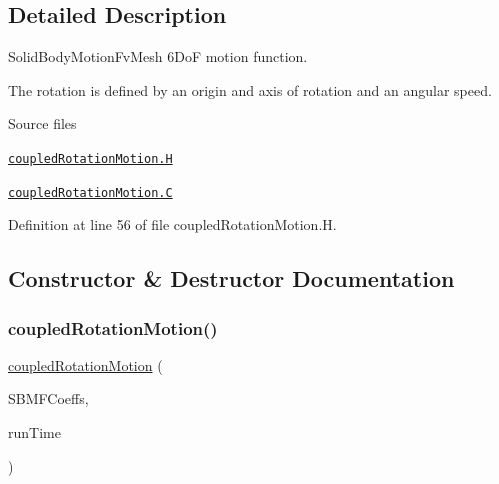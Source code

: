 \subsection{Detailed Description}
Solid\+Body\+Motion\+Fv\+Mesh 6\+DoF motion function. 

\label{_Description}%
 The rotation is defined by an origin and axis of rotation and an angular speed.

\begin{DoxyParagraph}{Source files}

\begin{DoxyItemize}
\item \href{../../../home/carlo/data/GeN-Foam/GeN-Foam_ffn/GeN-Foam/GeN-Foam/FMU4FOAM/ECI4FOAM/src/externalComm/externalIO/input/meshMotion/coupledRotationMotion/coupledRotationMotion.H}{\tt coupled\+Rotation\+Motion.\+H} 
\item \href{../../../home/carlo/data/GeN-Foam/GeN-Foam_ffn/GeN-Foam/GeN-Foam/FMU4FOAM/ECI4FOAM/src/externalComm/externalIO/input/meshMotion/coupledRotationMotion/coupledRotationMotion.C}{\tt coupled\+Rotation\+Motion.\+C} 
\end{DoxyItemize}
\end{DoxyParagraph}


Definition at line 56 of file coupled\+Rotation\+Motion.\+H.



\subsection{Constructor \& Destructor Documentation}
\mbox{\label{classFoam_1_1solidBodyMotionFunctions_1_1coupledRotationMotion_a7ad16617661870692e4069c402e74751}} 
\subsubsection{\texorpdfstring{coupled\+Rotation\+Motion()}{coupledRotationMotion()}}
{\footnotesize\ttfamily \hyperlink{classFoam_1_1solidBodyMotionFunctions_1_1coupledRotationMotion}{coupled\+Rotation\+Motion} (\begin{DoxyParamCaption}\item[{const dictionary \&}]{S\+B\+M\+F\+Coeffs,  }\item[{const Time \&}]{run\+Time }\end{DoxyParamCaption})}




